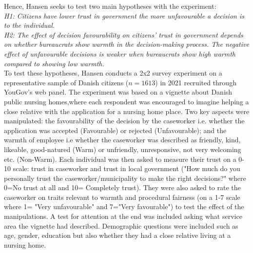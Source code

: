 \documentclass[12pt,letterpaper]{article}
\begin{document}
	\noindent Hence, Hansen seeks to test two main hypotheses with the experiment: \\
	
		\textit{H1:  Citizens have lower trust in government the more unfavourable a decision is to the	individual.} \\
		
		\textit{H2: The effect of decision favourability on citizens’ trust in government depends on whether bureaucrats show warmth in the decision-making process. The negative effect of unfavourable decisions is weaker when bureaucrats show high warmth compared to showing low warmth.} \\
	
		
	\noindent  
	To test these hypotheses, Hansen conducts a 2x2 survey experiment on a representative sample of Danish citizens ($n = 1613$) in 2021 recruited through YouGov's web panel. The experiment was based on a vignette about Danish public nursing homes,where each respondent was encouraged to imagine helping a close relative with the application for a nursing home place. Two key aspects were manipulated:  the favourability of the decision by the caseworker i.e. whether the application was accepted (Favourable) or rejected (Unfavourable); and the warmth of employee i.e whether the caseworker was described as friendly, kind, likeable, good-natured (Warm) or unfriendly, unresponsive, not very welcoming etc. (Non-Warm). Each individual was then asked to measure their trust on a 0-10 scale: trust in caseworker and trust in local government ("How much do you personally trust the caseworker/municipality to make the right decisions?" where 0=No trust at all and 10= Completely trust). They were also asked to rate the caseworker on traits relevant to warmth and procedural fairness (on a 1-7 scale where  1= "Very unfavourable" and 7="Very favourable") to test the effect of the manipulations. A test for attention at the end was included asking what service area the vignette had described. Demographic questions were included such as age, gender, education but also whether they had a close relative living at a nursing home.  

\vspace{1cm}
\end{document}
